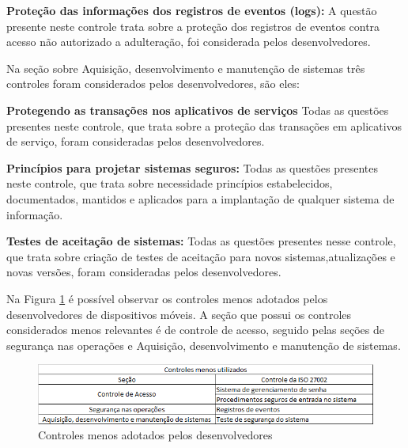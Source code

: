 \vspace{0.5cm}
\noindent\textbf{Proteção das informações dos registros de eventos (logs):}
A questão presente neste controle trata sobre a proteção dos registros de eventos contra acesso não autorizado a adulteração, foi considerada pelos desenvolvedores.
\vspace{0.5cm}

Na seção sobre Aquisição, desenvolvimento e manutenção de sistemas três controles foram considerados pelos desenvolvedores, são eles:

\vspace{0.5cm}
\noindent\textbf{Protegendo as transações nos aplicativos de serviços}
 Todas as questões presentes neste controle, que trata sobre a proteção das transações em aplicativos de serviço, foram consideradas pelos desenvolvedores.

\vspace{0.5cm}
\noindent\textbf{Princípios para projetar sistemas seguros:}
Todas as questões presentes neste controle, que trata sobre necessidade princípios estabelecidos, documentados, mantidos e aplicados para a implantação de qualquer sistema de informação.

\vspace{0.5cm}
\noindent\textbf{Testes de aceitação de sistemas:}
Todas as questões presentes nesse controle, que trata sobre criação de testes de aceitação para novos sistemas,atualizações e novas versões, foram consideradas pelos desenvolvedores.

\vspace{0.5cm}

Na Figura \ref{fig:cont2} é possível observar os controles menos adotados pelos desenvolvedores de dispositivos móveis. A seção que possui os controles considerados menos relevantes é de controle de acesso, seguido pelas seções de segurança nas operações e Aquisição, desenvolvimento e manutenção de sistemas.

\begin{figure}[H]
\vspace{1cm}
\centering
\includegraphics[scale=0.7]{fig2/menosusados.png}
\caption{Controles menos adotados pelos desenvolvedores}
\label{fig:cont2}
\end{figure}

